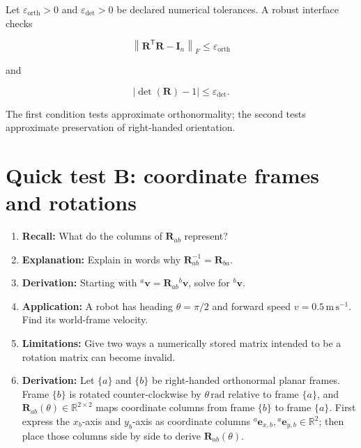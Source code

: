 \documentclass[
  australian,
  12pt,
  letterpaper,
  DIV=11,
  numbers=noendperiod,
  twoside]{scrreprt}
\providecommand{\tightlist}{%
  \setlength{\itemsep}{0pt}\setlength{\parskip}{0pt}}
\begin{document}
Let \(\varepsilon_{\mathrm{orth}}>0\) and \(\varepsilon_{\det}>0\) be
declared numerical tolerances. A robust interface checks

\[
\left\lVert\mathbf{R}^\mathsf{T}\mathbf{R}-\mathbf{I}_n\right\rVert_F
\leq
\varepsilon_{\mathrm{orth}}
\]

and

\[
\left|\det(\mathbf R)-1\right|
\leq
\varepsilon_{\det}.
\]

The first condition tests approximate orthonormality; the second tests
approximate preservation of right-handed orientation.

\section*{Quick test B: coordinate frames and
rotations}\label{quick-test-b-coordinate-frames-and-rotations}


\begin{enumerate}
\def\labelenumi{\arabic{enumi}.}
\tightlist
\item
  \textbf{Recall:} What do the columns of \(\mathbf{R}_{ab}\) represent?
\item
  \textbf{Explanation:} Explain in words why
  \(\mathbf{R}_{ab}^{-1}=\mathbf{R}_{ba}\).
\item
  \textbf{Derivation:} Starting with
  \({}^{a}\mathbf{v}=\mathbf{R}_{ab}{}^{b}\mathbf{v}\), solve for
  \({}^{b}\mathbf{v}\).
\item
  \textbf{Application:} A robot has heading \(\theta=\pi/2\) and forward
  speed \(v=0.5\,\mathrm{m\,s^{-1}}\). Find its world-frame velocity.
\item
  \textbf{Limitations:} Give two ways a numerically stored matrix
  intended to be a rotation matrix can become invalid.
\item
  \textbf{Derivation:} Let \(\{a\}\) and \(\{b\}\) be right-handed
  orthonormal planar frames. Frame \(\{b\}\) is rotated
  counter-clockwise by \(\theta\,\mathrm{rad}\) relative to frame
  \(\{a\}\), and \(\mathbf R_{ab}(\theta)\in\mathbb R^{2\times2}\) maps
  coordinate columns from frame \(\{b\}\) to frame \(\{a\}\). First
  express the \(x_b\)-axis and \(y_b\)-axis as coordinate columns
  \({}^{a}\mathbf e_{x,b},{}^{a}\mathbf e_{y,b}\in\mathbb R^2\); then
  place those columns side by side to derive \(\mathbf R_{ab}(\theta)\).
\end{enumerate}
\end{document}
